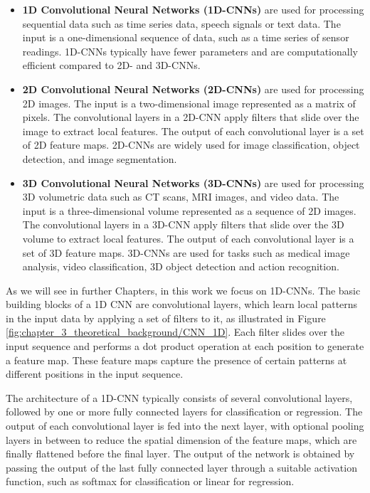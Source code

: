 \begin{itemize}
	
	\item \textbf{1D Convolutional Neural Networks (1D-\acp{CNN})} are used for processing sequential data such as time series data, speech signals or text data. The input is a one-dimensional sequence of data, such as a time series of sensor readings. 1D-\acp{CNN} typically have fewer parameters and are computationally efficient compared to 2D- and 3D-\acp{CNN}.
	
	\item \textbf{2D Convolutional Neural Networks (2D-\acp{CNN})} are used for processing 2D images. The input is a two-dimensional image represented as a matrix of pixels. The convolutional layers in a 2D-\ac{CNN} apply filters that slide over the image to extract local features. The output of each convolutional layer is a set of 2D feature maps. 2D-\acp{CNN} are widely used for image classification, object detection, and image segmentation.
	
	\item \textbf{3D Convolutional Neural Networks (3D-\acp{CNN})} are used for processing 3D volumetric data such as CT scans, MRI images, and video data. The input is a three-dimensional volume represented as a sequence of 2D images. The convolutional layers in a 3D-\ac{CNN} apply filters that slide over the 3D volume to extract local features. The output of each convolutional layer is a set of 3D feature maps. 3D-\acp{CNN} are used for tasks such as medical image analysis, video classification, 3D object detection and action recognition.
	
\end{itemize}

As we will see in further Chapters, in this work we focus on 1D-\acp{CNN}. The basic building blocks of a 1D \ac{CNN} are convolutional layers, which learn local patterns in the input data by applying a set of filters to it, as illustrated in Figure \ref{fig:chapter_3_theoretical_background/CNN_1D}. Each filter slides over the input sequence and performs a dot product operation at each position to generate a feature map. These feature maps capture the presence of certain patterns at different positions in the input sequence. 
 
The architecture of a 1D-\ac{CNN} typically consists of several convolutional layers, followed by one or more fully connected layers for classification or regression. The output of each convolutional layer is fed into the next layer, with optional pooling layers in between to reduce the spatial dimension of the feature maps, which are finally flattened before the final layer. The output of the network is obtained by passing the output of the last fully connected layer through a suitable activation function, such as softmax for classification or linear for regression.
 

